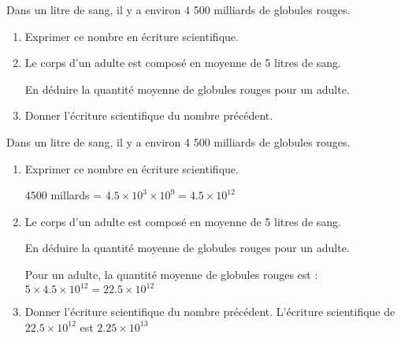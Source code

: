\begin{exercice*}
    Dans un litre de sang, il y a environ 4 500 milliards de globules rouges.
    \begin{enumerate}
        \item Exprimer ce nombre en écriture scientifique.
        \item Le corps d’un adulte est composé en moyenne de 5 litres de sang.
        
        En déduire la quantité moyenne de globules rouges pour un adulte.
        \item Donner l'écriture scientifique du nombre précédent.
    \end{enumerate}    
\end{exercice*}
\begin{corrige}
    Dans un litre de sang, il y a environ 4 500 milliards de globules rouges.
    \begin{enumerate}
        \item Exprimer ce nombre en écriture scientifique.
        
        {\red $\num{4500}$ millards = $\num{4.5}\times 10^3\times 10^9 = \num{4.5}\times 10^{12}$}
        \item Le corps d’un adulte est composé en moyenne de 5 litres de sang.
        
        En déduire la quantité moyenne de globules rouges pour un adulte.

        {\red Pour un adulte, la quantité moyenne de globules rouges est : $5\times \num{4.5}\times 10^{12} = \num{22.5}\times 10^{12}$}
        \item Donner l'écriture scientifique du nombre précédent.
        {\red L'écriture scientifique de $\num{22.5}\times 10^{12}$ est  $\num{2.25}\times 10^{13}$}
    \end{enumerate}    
\end{corrige}

